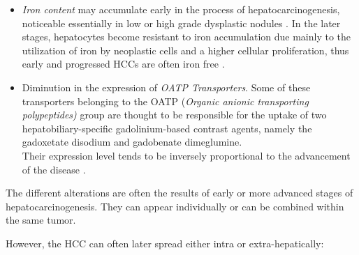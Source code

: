 \documentclass[]{article}
\begin{document}
\begin{itemize}
\item
  \emph{Iron content} may accumulate early in the process of
  hepatocarcinogenesis, noticeable essentially in low or high grade
  dysplastic nodules \cite{Kojiro2009}. In the later
  stages, hepatocytes become resistant to iron accumulation due mainly
  to the utilization of iron by neoplastic cells and a higher cellular
  proliferation, thus early and progressed HCCs are often iron free
  \cite{Gurusamy2007}.
\item
  Diminution in the expression of \emph{	OATP Transporters}. Some of
  these transporters belonging to the OATP (\emph{Organic anionic
  transporting polypeptides)} group are thought to be responsible for
  the uptake of two hepatobiliary-specific gadolinium-based contrast
  agents, namely the gadoxetate disodium and gadobenate dimeglumine.\\
  Their expression level tends to be inversely proportional to the
  advancement of the disease \cite{Kitao2011,Tsuboyama2010}.
\end{itemize}

The different alterations are often the results of early or more
advanced stages of hepatocarcinogenesis. They can appear individually or
can be combined within the same tumor.

However, the HCC can often later spread either intra or
extra-hepatically:
\end{document}
